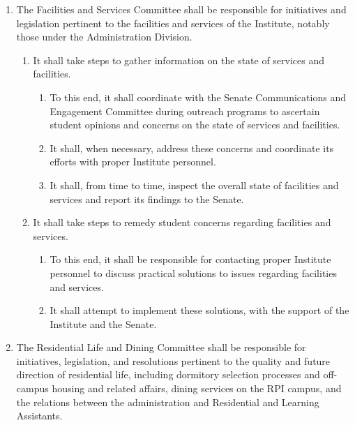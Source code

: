 \documentclass{uniondoc}
\begin{document}
\begin{enumerate}
\begin{enumerate}
		      \item Its membership shall consist of the Director of the Union, as a non-voting member; the Business Administrator, as a non-voting member; the President of the Union as a non-voting ex-officio member; at least one graduate member of the Student Body; and at least one undergraduate member of the Executive Board.
	      \end{enumerate}
	\item The Facilities and Services Committee shall be responsible for initiatives and legislation pertinent to the facilities and services of the Institute, notably those under the Administration Division.
	      \begin{enumerate}
		      \item It shall take steps to gather information on the state of services and facilities.
		            \begin{enumerate}
			            \item To this end, it shall coordinate with the Senate Communications and Engagement Committee during outreach programs to ascertain student opinions and concerns on the state of services and facilities.
			            \item It shall, when necessary, address these concerns and coordinate its efforts with proper Institute personnel.
			            \item It shall, from time to time, inspect the overall state of facilities and services and report its findings to the Senate.
		            \end{enumerate}
		      \item It shall take steps to remedy student concerns regarding facilities and services.
		            \begin{enumerate}
			            \item To this end, it shall be responsible for contacting proper Institute personnel to discuss practical solutions to issues regarding facilities and services.
			            \item It shall attempt to implement these solutions, with the support of the Institute and the Senate.
		            \end{enumerate}
	      \end{enumerate}
	\item The Residential Life and Dining Committee shall be responsible for initiatives, legislation, and resolutions pertinent to the quality and future direction of residential life, including dormitory selection processes and off-campus housing and related affairs, dining services on the RPI campus, and the relations between the administration and Residential and Learning Assistants.

\end{enumerate}
\end{document}
